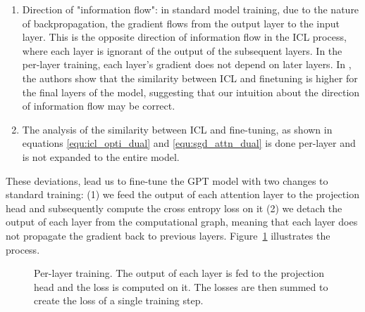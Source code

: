 \documentclass[11pt]{article}
\begin{document}
\begin{enumerate}
	\item Direction of "information flow": in standard model training, due to the nature of backpropagation, the gradient flows from the output layer to the input layer.
	      This is the opposite direction of information flow in the ICL process, where each layer is ignorant of the output of the subsequent layers.
	      In the per-layer training, each layer's gradient does not depend on later layers.
	      In \cite{dai2023gpt}, the authors show that the similarity between ICL and finetuning is higher for the final layers of the model, suggesting that our intuition about the direction of information flow may be correct.
	\item The analysis of the similarity between ICL and fine-tuning, as shown in equations \ref{equ:icl_opti_dual} and \ref{equ:sgd_attn_dual} is done per-layer and is not expanded to the entire model.
\end{enumerate}
These deviations, lead us to fine-tune the GPT model with two changes to standard training: (1) we feed the output of each attention layer to the projection head and subsequently compute the cross entropy loss on it
(2) we detach the output of each layer from the computational graph, meaning that each layer does not propagate the gradient back to previous layers. Figure~\ref{per-layer-training} illustrates the process.



\begin{figure}%
	\centering
	\caption{Per-layer training. The output of each layer is fed to the projection head and the loss is computed on it. The losses are then summed to create the loss of a single training step.}
	\label{per-layer-training}
\end{figure}
\end{document}
